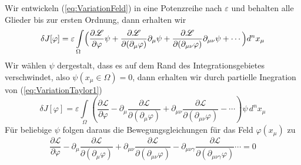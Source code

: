 Wir entwickeln (\ref{eq:VariationFeld}) in eine Potenzreihe nach $\varepsilon$
und behalten alle Glieder bis zur ersten Ordnung, dann erhalten wir
\begin{equation}\label{eq:VariationTaylor1}
  \delta J[\varphi]=\varepsilon\int\limits_{\Omega}\Bigl(
    \frac{\partial\mathcal{L}}{\partial\varphi}\psi
    +\frac{\partial\mathcal{L}}{\partial(\partial_{\mu}\varphi)}\partial_{\mu}\psi
  +\frac{\partial\mathcal{L}}{\partial(\partial_{\mu\nu}\varphi)}\partial_{\mu\nu}\psi+\cdots\Bigr)d^n x_\mu
\end{equation}
Wir wählen $\psi$ dergestalt, dass es auf dem Rand des Integrationsgebietes
verschwindet, also $\psi(x_{\mu}\in\Omega)=0$, dann erhalten wir durch
partielle Inegration von (\ref{eq:VariationTaylor1})
\begin{equation}\label{eq:VariationFunktionalFeld}
 \delta J[\varphi]=\varepsilon\int\limits_{\Omega}\left(
    \frac{\partial\mathcal{L}}{\partial\varphi}
    -\partial_{\mu}\frac{\partial\mathcal{L}}{\partial(\partial_{\mu}\varphi)}
    +\partial_{\mu\nu}\frac{\partial\mathcal{L}}{\partial(\partial_{\mu\nu}\varphi)}
  -\cdots\right)\psi\, d^n x_\mu
\end{equation}
Für beliebige $\psi$ folgen daraus die Bewegungsgleichungen für das Feld $\varphi(x_\mu)$ zu
\begin{equation}
  \frac{\partial\mathcal{L}}{\partial\varphi}
  -\partial_{\mu}\frac{\partial\mathcal{L}}{\partial(\partial_{\mu}\varphi)}
  +\partial_{\mu\nu}\frac{\partial\mathcal{L}}{\partial(\partial_{\mu\nu}\varphi)}
  -\partial_{\mu\nu\gamma}\frac{\partial\mathcal{L}}{\partial(\partial_{\mu\nu\gamma}\varphi)}
  \cdots=0
  \label{eq:EulerLagrangeFeld}
\end{equation}
